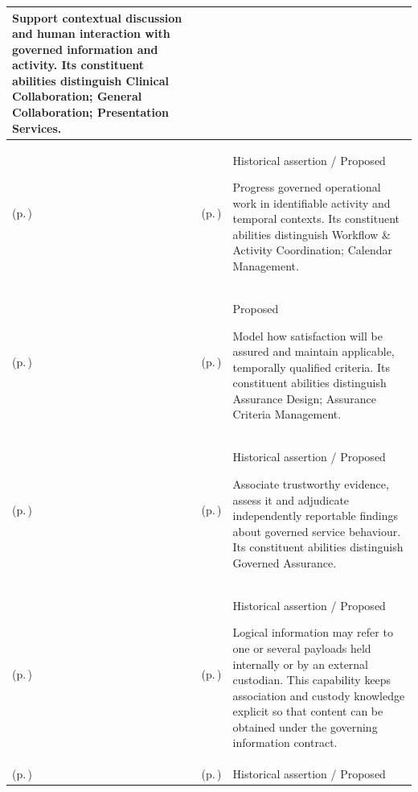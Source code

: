 \begin{longtable}{|>{\raggedright\arraybackslash}p{0.27\TableWidth}|>{\raggedright\arraybackslash}p{0.27\TableWidth}|>{\raggedright\arraybackslash}p{0.46\TableWidth}|}
Support contextual discussion and human interaction with governed information and activity. Its constituent abilities distinguish Clinical Collaboration; General Collaboration; Presentation Services.\\\hline
\nameref{cap:bec-human-collaboration-work-enablement} (p.\,\pageref{cap:bec-human-collaboration-work-enablement}) & \nameref{cap:bec-operational-activity-temporal-enablement} (p.\,\pageref{cap:bec-operational-activity-temporal-enablement}) & Historical assertion / Proposed

Progress governed operational work in identifiable activity and temporal contexts. Its constituent abilities distinguish Workflow \& Activity Coordination; Calendar Management.\\\hline
\nameref{cap:bec-independent-service-assurance-enablement} (p.\,\pageref{cap:bec-independent-service-assurance-enablement}) & \nameref{cap:bec-assurance-specification-enablement} (p.\,\pageref{cap:bec-assurance-specification-enablement}) & Proposed

Model how satisfaction will be assured and maintain applicable, temporally qualified criteria. Its constituent abilities distinguish Assurance Design; Assurance Criteria Management.\\\hline
\nameref{cap:bec-independent-service-assurance-enablement} (p.\,\pageref{cap:bec-independent-service-assurance-enablement}) & \nameref{cap:bec-independent-assurance-evaluation-enablement} (p.\,\pageref{cap:bec-independent-assurance-evaluation-enablement}) & Historical assertion / Proposed

Associate trustworthy evidence, assess it and adjudicate independently reportable findings about governed service behaviour. Its constituent abilities distinguish Governed Assurance.\\\hline
\nameref{cap:bec-clinical-information-stewardship-enablement} (p.\,\pageref{cap:bec-clinical-information-stewardship-enablement}) & \nameref{cap:bec-associated-clinical-binary-content-enablement} (p.\,\pageref{cap:bec-associated-clinical-binary-content-enablement}) & Historical assertion / Proposed

Logical information may refer to one or several payloads held internally or by an external custodian. This capability keeps association and custody knowledge explicit so that content can be obtained under the governing information contract.\\\hline
\nameref{cap:bec-clinical-information-stewardship-enablement} (p.\,\pageref{cap:bec-clinical-information-stewardship-enablement}) & \nameref{cap:bec-information-authority-representation} (p.\,\pageref{cap:bec-information-authority-representation}) & Historical assertion / Proposed


\end{longtable}
